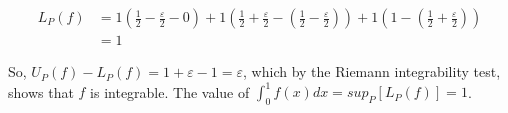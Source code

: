 \documentclass[]{article}
\begin{document}
		\begin{align*}
			L_P(f) &= 1 \left (\frac{1}{2} - \frac{\varepsilon}{2} - 0 \right ) + 1\left (\frac{1}{2} + \frac{\varepsilon}{2} - \left (\frac{1}{2} - \frac{\varepsilon}{2}\right ) \right ) + 1\left (1 - \left (\frac{1}{2} + \frac{\varepsilon}{2} \right) \right ) \\
			&= 1 
		\end{align*}

		So, $U_P(f) - L_P(f) = 1 + \varepsilon - 1 = \varepsilon$, which by the Riemann integrability test, shows that $f$ is integrable. The value of $\int_0^1 f(x) dx = sup_P[ L_P(f) ] = 1$.
\end{document}
